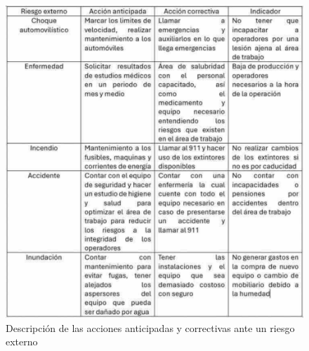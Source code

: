     \begin{figure}[H]
        \centering
        \includegraphics[trim = {1mm 1mm 1mm 1mm},clip,scale=0.3]{8/Img/Descripcion de acciones anticipadas.pdf}
        \caption{Descripción de las acciones anticipadas y correctivas ante un riesgo externo}
        \label{DescripcionAntExterno}
    \end{figure}
    
